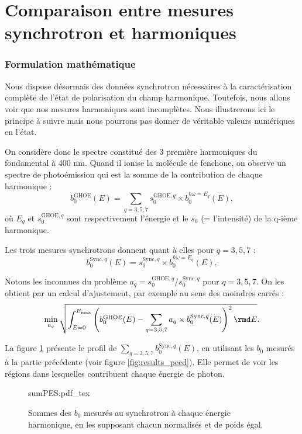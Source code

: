 \section{Comparaison entre mesures synchrotron et harmoniques}
\subsubsection{Formulation mathématique}
Nous dispose désormais des données synchrotron nécessaires à la caractérisation complète de l'état de polarisation du champ harmonique. Toutefois, nous allons voir que nos mesures harmoniques sont incomplètes. Nous illustrerons ici le principe à suivre mais nous pourrons pas donner de véritable valeurs numériques en l'état.

On considère donc le spectre constitué des 3 première harmoniques du fondamental à 400 nm. Quand il ionise la molécule de fenchone, on observe un spectre de photoémission qui est la somme de la contribution de chaque harmonique :
\[ b^{\text{GHOE}}_0(E) = \sum_{q={3,5,7}} s^{\text{GHOE},q}_0 \times b^{\hbar\omega=E_q}_0(E),\]
où $E_q$ et $s^{\text{GHOE},q}_0$ sont respectivement l'énergie et le $s_0$ (= l'intensité) de la q-ième harmonique.

Les trois mesures synchrotrons donnent quant à elles pour $q=3,5,7$ :
\[ b^{\text{Sync},q}_0(E) =  s^{\text{Sync},q}_0 \times b^{\hbar\omega=E_q}_0(E),\]

Notons les inconnues du problème $a_q = s^{\text{GHOE},q}_0/s^{\text{Sync},q}_0$ pour $q=3,5,7.$ On les obtient par un calcul d'ajustement, par exemple au sens des moindres carrés :
\begin{equation}
\min_{a_q} \sqrt{\int_{E=0}^{E_\text{max}} \left(b^{\text{GHOE}}_0(E)-\sum_{q={3,5,7}} a_q \times b^{\text{Sync},q}_0(E)\right)^2\rmd E}.
\label{eq:minb0}
\end{equation}

La figure \ref{fig:sumb0} présente le profil de $\sum_{q={3,5,7}} b^{\text{Sync},q}_0(E)$, en utilisant les $b_0$ mesurés à la partie précédente (voir figure \ref{fig:results_pecd}). Elle permet de voir les régions dans lesquelles contribuent chaque énergie de photon.

\begin{figure}[!ht]
\centering
\def\svgwidth{0.8\columnwidth}
{sumPES.pdf_tex}
\caption{Sommes des $b_0$ mesurés au synchrotron à chaque énergie harmonique, en les supposant chacun normalisés et de poids égal.}
\label{fig:sumb0}
\end{figure}

